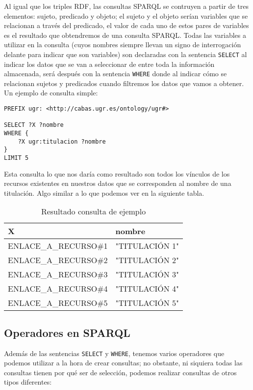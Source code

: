 \bigskip
Al igual que los triples {\sf RDF}, las consultas {\sf SPARQL} se contruyen a partir de tres elementos: sujeto, predicado y objeto; el sujeto y el objeto serían variables que se relacionan a través del predicado, el valor de cada uno de estos pares de variables es el resultado que obtendremos de una consulta {\sf SPARQL}. Todas las variables a utilizar en la consulta (cuyos nombres siempre llevan un signo de interrogación delante para indicar que son variables) son declaradas con la sentencia {\tt SELECT} al indicar los datos que se van a seleccionar de entre toda la información almacenada, será después con la sentencia {\tt WHERE} donde al indicar cómo se relacionan sujetos y predicados cuando filtremos los datos que vamos a obtener. Un ejemplo de consulta simple: 

\begin{verbatim}
PREFIX ugr: <http://cabas.ugr.es/ontology/ugr#>

SELECT ?X ?nombre
WHERE {
    ?X ugr:titulacion ?nombre
}
LIMIT 5
\end{verbatim}

Esta consulta lo que nos daría como resultado son todos los vínculos de los recursos existentes en nuestros datos que se corresponden al nombre de una titulación. Algo similar a lo que podemos ver en la siguiente tabla.

\begin{table}[!ht]
	\centering
	\begin{tabular}{|p{}|p{}|}
		\hline
		\textbf{X} &
		\textbf{nombre}
		\\ \hline
		ENLACE\_A\_RECURSO\#1&
		"TITULACIÓN 1"
		\\ \hline
		ENLACE\_A\_RECURSO\#2&
		"TITULACIÓN 2"
		\\ \hline
		ENLACE\_A\_RECURSO\#3&
		"TITULACIÓN 3"
		\\ \hline
		ENLACE\_A\_RECURSO\#4&
		"TITULACIÓN 4"
		\\ \hline
		ENLACE\_A\_RECURSO\#5&
		"TITULACIÓN 5"
		\\ \hline
	\end{tabular}
	\caption{Resultado consulta de ejemplo}
	\label{consulta-ejemplo}
\end{table}

\subsection{Operadores en SPARQL}

Además de las sentencias {\tt SELECT} y {\tt WHERE}, tenemos varios operadores que podemos utilizar a la hora de crear consultas; no obstante, ni siquiera todas las consultas tienen por qué ser de selección, podemos realizar consultas de otros tipos diferentes:

